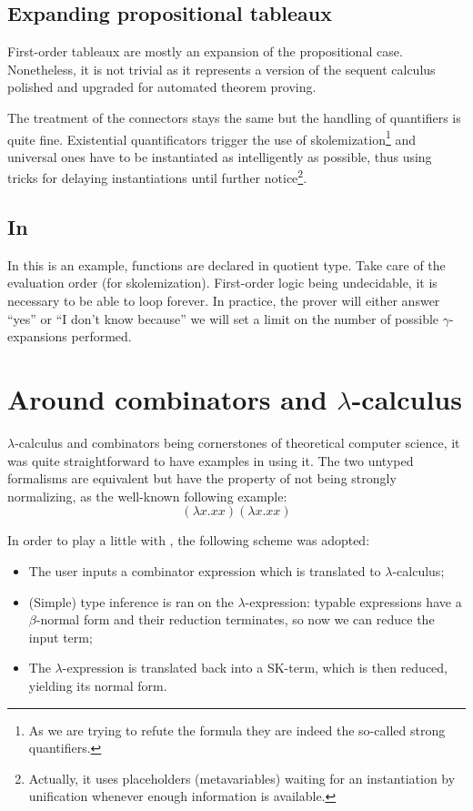 \subsection{Expanding propositional tableaux}
\label{sec:prop2fo}

First-order tableaux are mostly an expansion of the propositional
case. Nonetheless, it is not trivial as it represents a version of the
sequent calculus polished and upgraded for automated theorem proving.

The treatment of the connectors stays the same but the handling of
quantifiers is quite fine. Existential quantificators trigger the use
of skolemization\footnote{As we are trying to refute the formula they
  are indeed the so-called strong quantifiers.} and universal ones
have to be instantiated as intelligently as possible, thus using
tricks for delaying instantiations until further
notice\footnote{Actually, it uses placeholders (metavariables) waiting
  for an instantiation by unification whenever enough information is
  available.}. 

\subsection{In \moca}
\label{sec:moca_fo}

In this is an example, functions are declared in quotient type.
Take care of the evaluation order (for skolemization).
First-order logic being undecidable, it is necessary to be able to
loop forever. In practice, the prover will either answer ``yes'' or ``I don't
know because'' we will set a limit on the number of possible 
$\gamma$-expansions performed.


\section{Around combinators and $\lambda$-calculus}
\label{sec:lambda2ski}

$\lambda$-calculus and combinators being cornerstones of theoretical computer
science, it was quite straightforward to have examples in \moca using
it. The two untyped formalisms are equivalent but have the property of
not being strongly normalizing, as the well-known following example:
\[ (\lambda x.x x)(\lambda x.x x) \]

In order to play a little with \moca, the following scheme was adopted:
\begin{itemize}
\item The user inputs a combinator expression which is translated to
  $\lambda$-calculus; 
\item (Simple) type inference is ran on the $\lambda$-expression:
  typable expressions have a $\beta$-normal form and their reduction
  terminates, so now we can reduce the input term;
\item The $\lambda$-expression is translated back into a SK-term,
  which is then reduced, yielding its normal form.
\end{itemize}

